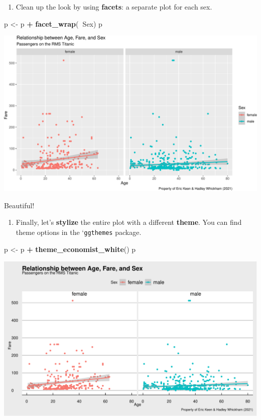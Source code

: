 \documentclass[
]{book}
\newenvironment{Shaded}{\begin{snugshade}}{\end{snugshade}}
\newcommand{\KeywordTok}[1]{\textcolor[rgb]{0.13,0.29,0.53}{\textbf{#1}}}
\newcommand{\NormalTok}[1]{#1}
\newcommand{\OperatorTok}[1]{\textcolor[rgb]{0.81,0.36,0.00}{\textbf{#1}}}
\newcommand{\StringTok}[1]{\textcolor[rgb]{0.31,0.60,0.02}{#1}}
\providecommand{\tightlist}{%
  \setlength{\itemsep}{0pt}\setlength{\parskip}{0pt}}
\begin{document}
\begin{enumerate}
\def\labelenumi{(\arabic{enumi})}
\setcounter{enumi}{6}
\tightlist
\item
  Clean up the look by using \textbf{facets}: a separate plot for each sex.
\end{enumerate}

\begin{Shaded}
\begin{Highlighting}[]
\NormalTok{p <-}\StringTok{ }\NormalTok{p }\OperatorTok{+}\StringTok{ }\KeywordTok{facet_wrap}\NormalTok{(}\OperatorTok{~}\NormalTok{Sex)}
\NormalTok{p}
\end{Highlighting}
\end{Shaded}

\includegraphics{figures/unnamed-chunk-253-1.pdf}

Beautiful!

\begin{enumerate}
\def\labelenumi{(\arabic{enumi})}
\setcounter{enumi}{7}
\tightlist
\item
  Finally, let's \textbf{stylize} the entire plot with a different \textbf{theme}. You can find theme options in the `\texttt{ggthemes} package.
\end{enumerate}

\begin{Shaded}
\begin{Highlighting}[]
\NormalTok{p <-}\StringTok{ }\NormalTok{p }\OperatorTok{+}\StringTok{ }\KeywordTok{theme_economist_white}\NormalTok{()}
\NormalTok{p}
\end{Highlighting}
\end{Shaded}

\includegraphics{figures/unnamed-chunk-254-1.pdf}
\end{document}

